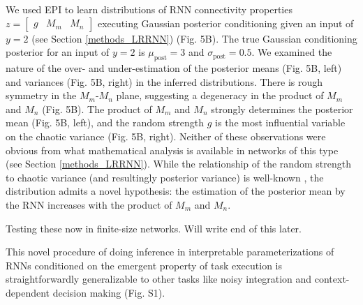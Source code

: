 \documentclass[11pt]{article}
\begin{document}
We used EPI to learn distributions of RNN connectivity properties $z = \begin{bmatrix} g & M_m & M_n \end{bmatrix}$ executing Gaussian posterior conditioning given an input of $y=2$ (see Section \ref{methods_LRRNN}) (Fig. 5B). The true Gaussian conditioning posterior for an input of $y=2$ is $\mu_{\text{post}}=3$ and $\sigma_{\text{post}} = 0.5$.   We examined the nature of the over- and under-estimation of the posterior means (Fig. 5B, left) and variances (Fig. 5B, right) in the inferred distributions.  There is rough symmetry in the $M_m$-$M_n$ plane, suggesting a degeneracy in the product of $M_m$ and $M_n$ (Fig. 5B).  
The product of $M_m$ and $M_n$ strongly determines the posterior mean (Fig. 5B, left), and the random strength $g$ is the most influential variable on the chaotic variance (Fig. 5B, right).
Neither of these observations were obvious from what mathematical analysis is available in networks of this type (see Section \ref{methods_LRRNN}).  While the relationship of the random strength to chaotic variance (and resultingly posterior variance) is well-known \cite{sompolinsky1988chaos}, the distribution admits a novel hypothesis: the estimation of the posterior mean by the RNN increases with the product of $M_m$ and $M_n$.

Testing these now in finite-size networks.  Will write end of this later.



This novel procedure of doing inference in interpretable parameterizations of RNNs conditioned on the emergent property of task execution is straightforwardly generalizable to other tasks like noisy integration and context-dependent decision making (Fig. S1).
\end{document}
